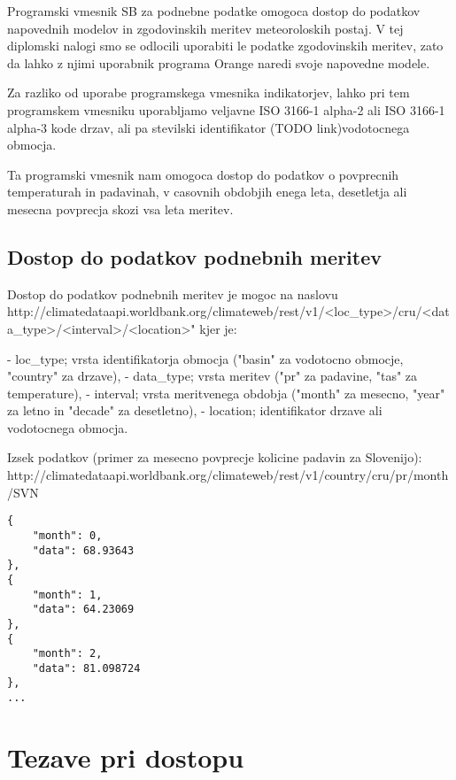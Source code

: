 Programski vmesnik SB za podnebne podatke omogoca dostop do podatkov 
napovednih modelov in zgodovinskih meritev meteoroloskih postaj. V tej 
diplomski nalogi smo se odlocili uporabiti le podatke zgodovinskih meritev, 
zato da lahko z njimi uporabnik programa Orange naredi svoje napovedne modele.

Za razliko od uporabe programskega vmesnika indikatorjev, lahko pri tem
programskem vmesniku uporabljamo veljavne ISO 3166-1 alpha-2 ali ISO 3166-1 
alpha-3 kode drzav, ali pa stevilski identifikator (TODO link)vodotocnega 
obmocja.

Ta programski vmesnik nam omogoca dostop do podatkov o povprecnih temperaturah 
in padavinah, v casovnih obdobjih enega leta, desetletja ali mesecna povprecja 
skozi vsa leta meritev.


\subsection{Dostop do podatkov podnebnih meritev}

Dostop do podatkov podnebnih meritev je mogoc na naslovu
http://climatedataapi.worldbank.org/climateweb/rest/v1/<loc\_type>/cru/<data\_type>/<interval>/<location>"  
kjer je:

- loc\_type; vrsta identifikatorja obmocja ("basin" za vodotocno obmocje, 
  "country" za drzave),
- data\_type; vrsta meritev ("pr" za padavine, "tas" za temperature),
- interval; vrsta meritvenega obdobja ("month" za mesecno, "year" za letno in
  "decade" za desetletno),
- location; identifikator drzave ali vodotocnega obmocja.


Izsek podatkov (primer za mesecno povprecje kolicine padavin za Slovenijo):
http://climatedataapi.worldbank.org/climateweb/rest/v1/country/cru/pr/month/SVN

\begin{lstlisting}
{
    "month": 0,
    "data": 68.93643
},
{
    "month": 1,
    "data": 64.23069
},
{
    "month": 2,
    "data": 81.098724
},
...
\end{lstlisting}











\section{Tezave pri dostopu}


